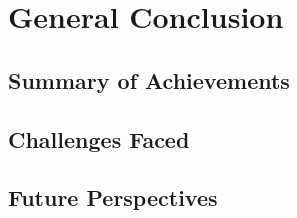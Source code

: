 \chapter{General Conclusion}

\section{Summary of Achievements}
\section{Challenges Faced}
\section{Future Perspectives}
